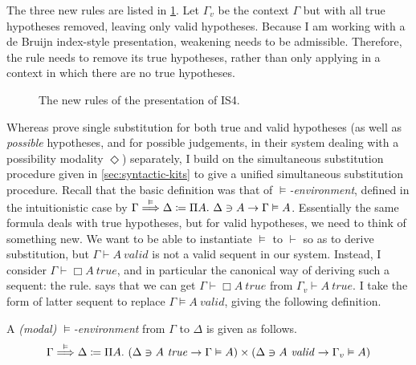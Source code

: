 The three new rules are listed in \cref{fig:PD}.
Let $\Gamma_v$ be the context $\Gamma$ but with all true hypotheses removed,
leaving only valid hypotheses.
Because I am working with a de Bruijn index-style presentation, weakening needs
to be admissible.
Therefore, the  rule needs to remove its true hypotheses,
rather than only applying in a context in which there are no true hypotheses.

\begin{figure}
  \caption{The new rules of the \citeauthor{judgmental} presentation of IS4.}
  \label{fig:PD}
\end{figure}

Whereas \citet{judgmental} prove single substitution for both true and valid
hypotheses (as well as \emph{possible} hypotheses, and for possible judgements,
in their system dealing with a possibility modality $\Diamond$) separately, I
build on the simultaneous substitution procedure given in
\cref{sec:syntactic-kits} to give a unified simultaneous substitution procedure.
Recall that the basic definition was that of \emph{$\vDash$-environment},
defined in the intuitionistic case by
$\Gamma \stackrel{\vDash}\Longrightarrow \Delta \coloneqq \Pi A.~\Delta \ni A \to \Gamma \vDash A$.
Essentially the same formula deals with true hypotheses, but for valid
hypotheses, we need to think of something new.
We want to be able to instantiate $\vDash$ to $\vdash$ so as to derive
substitution, but $\Gamma \vdash A~\mathit{valid}$ is not a valid sequent in our
system.
Instead, I consider $\Gamma \vdash \Box A~\mathit{true}$, and in particular the
canonical way of deriving such a sequent: the  rule.
 says that we can get
$\Gamma \vdash \Box A~\mathit{true}$ from $\Gamma_v \vdash A~\mathit{true}$.
I take the form of latter sequent to replace $\Gamma \vDash A~\mathit{valid}$,
giving the following definition.

\begin{definition}\label{def:PD-env}
  A \emph{(modal) $\vDash$-environment} from $\Gamma$ to $\Delta$ is given as
  follows.
  \[
    \Gamma \env\vDash \Delta \coloneqq
    \Pi A.~\plr{\Delta \ni A~\mathit{true} \to \Gamma \vDash A}
    \times \plr{\Delta \ni A~\mathit{valid} \to \Gamma_v \vDash A}
  \]
\end{definition}

